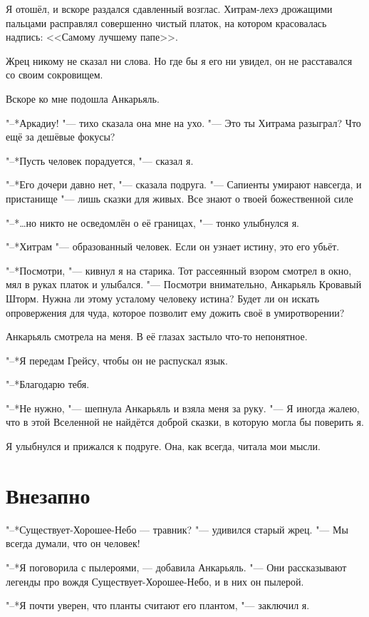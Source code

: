 \documentclass[a4paper,10pt]{book}
\newcommand{\ldotst}{\so{...}\xspace}
\begin{document}
Я отошёл, и вскоре раздался сдавленный возглас. Хитрам-лехэ дрожащими пальцами 
расправлял совершенно чистый платок, на котором красовалась надпись: <<Самому 
лучшему папе>>.

Жрец никому не сказал ни слова. Но где бы я его ни увидел, он не расставался со 
своим сокровищем.

Вскоре ко мне подошла Анкарьяль.

"--*Аркадиу! "--- тихо сказала она мне на ухо. "--- Это ты Хитрама разыграл? 
Что 
ещё за дешёвые фокусы?

"--*Пусть человек порадуется, "--- сказал я.

"--*Его дочери давно нет, "--- сказала подруга. "--- Сапиенты умирают навсегда, 
и 
пристанище "--- лишь сказки для живых. Все знают о твоей божественной 
силе\ldotst

"--*\ldots но никто не осведомлён о её границах, "--- тонко улыбнулся я.

"--*Хитрам "--- образованный человек. Если он узнает истину, это его убьёт.

"--*Посмотри, "--- кивнул я на старика. Тот рассеянный взором смотрел в окно, 
мял 
в руках платок и улыбался. "--- Посмотри внимательно, Анкарьяль Кровавый Шторм. 
Нужна ли этому усталому человеку истина? Будет ли он искать опровержения для 
чуда, которое позволит ему дожить своё в умиротворении?

Анкарьяль смотрела на меня. В её глазах застыло что-то непонятное.

"--*Я передам Грейсу, чтобы он не распускал язык.

"--*Благодарю тебя.

"--*Не нужно, "--- шепнула Анкарьяль и взяла меня за руку. "--- Я иногда жалею, 
что в этой Вселенной не найдётся доброй сказки, в которую могла бы поверить я.

Я улыбнулся и прижался к подруге. Она, как всегда, читала мои мысли.

\section{Внезапно}

"--*Существует-Хорошее-Небо — травник? "--- удивился старый жрец. "--- Мы 
всегда 
думали, что он человек!

"--*Я поговорила с пылероями, — добавила Анкарьяль. "--- Они рассказывают 
легенды 
про вождя Существует-Хорошее-Небо, и в них он пылерой.

"--*Я почти уверен, что планты считают его плантом, "--- заключил я.
\end{document}
